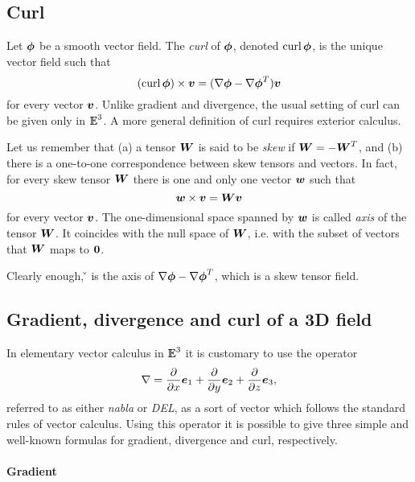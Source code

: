 \documentclass{31x47jw}
\begin{document}
\subsection{Curl}

Let ${\mbox{\boldmath $\phi$}}$ be a smooth vector field.  The \emph{curl} of ${\mbox{\boldmath $\phi$}}$, denoted
$\mbox{\rm curl}\, {\mbox{\boldmath $\phi$}}$, is the unique vector field such that
\[
(\mbox{\rm curl}\, {\mbox{\boldmath $\phi$}}) \times {\mbox{\boldmath $v$}} = (\nabla{\mbox{\boldmath $\phi$}} - \nabla{\mbox{\boldmath $\phi$}}^{T}) {\mbox{\boldmath $v$}}
\]
for every vector ${\mbox{\boldmath $v$}}$.  Unlike gradient and divergence, the usual
setting of curl can be given only in $\mathbb{I\!\!E}^{3}$.  A more general
definition of curl requires exterior calculus.

Let us remember that (a) a tensor ${\mbox{\boldmath $W$}}$ is said to be \emph{skew} if  
${\mbox{\boldmath $W$}} = -{\mbox{\boldmath $W$}}^{T}$, and (b) there is a one-to-one correspondence 
between skew tensors and vectors. In fact, for every skew tensor ${\mbox{\boldmath $W$}}$ 
there is one and only one vector ${\mbox{\boldmath $w$}}$ such that 
\[
{\mbox{\boldmath $w$}} \times {\mbox{\boldmath $v$}} = {\mbox{\boldmath $W$}}{\mbox{\boldmath $v$}}
\]
for every vector ${\mbox{\boldmath $v$}}$.  The one-dimensional space spanned by
${\mbox{\boldmath $w$}}$ is called \emph{axis} of the tensor ${\mbox{\boldmath $W$}}$.  It coincides
with the null space of ${\mbox{\boldmath $W$}}$, i.e. with the subset of vectors that
${\mbox{\boldmath $W$}}$ maps to ${\mbox{\boldmath $0$}}$.

Clearly enough, \curl \v{\phi} is the axis of 
$\nabla{\mbox{\boldmath $\phi$}} - \nabla{\mbox{\boldmath $\phi$}}^{T}$, which is a skew tensor field.





\subsection{Gradient, divergence and curl of a 3D field}

In elementary vector calculus in $\mathbb{I\!\!E}^{3}$ it is customary to use the operator
\[
\nabla = 
{\partial\over \partial x}{\mbox{\boldmath $e$}}_{1} +
{\partial\over \partial y}{\mbox{\boldmath $e$}}_{2} +
{\partial\over \partial z}{\mbox{\boldmath $e$}}_{3} ,
\]
referred to as either \emph{nabla} or \emph{DEL}, as a sort of vector 
which follows the standard rules of vector calculus. Using 
this operator it is possible to give three simple and well-known formulas for
gradient, divergence and curl, respectively. 

\paragraph{Gradient}
\end{document}
